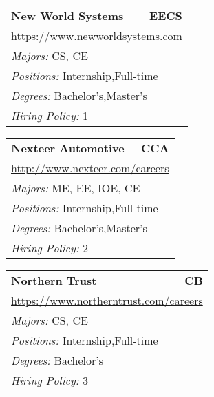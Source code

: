 \documentclass[twoside]{article}
\begin{document}
\begin{center}
\begin{multicols}{3}
\begin{FlushLeft}
\begin{minipage}{\columnwidth}
\end{minipage}
 
\begin{minipage}{\columnwidth}\begin{tabularx}{.95\columnwidth}{Xr}
                 {\Large\bf New World Systems} & {\Large\bf EECS}\\
    \multicolumn{2}{p{.95\columnwidth}}{\url{https://www.newworldsystems.com}}\\
    \multicolumn{2}{p{.95\columnwidth}}{\emph{Majors:} CS, CE}\\
    \multicolumn{2}{p{.95\columnwidth}}{\emph{Positions:} Internship,Full-time}\\
    \multicolumn{2}{p{.95\columnwidth}}{\emph{Degrees:} Bachelor's,Master's}\\
    \multicolumn{2}{p{.95\columnwidth}}{\emph{Hiring Policy:} 1}\\
    \end{tabularx}
    
\end{minipage}
 
\begin{minipage}{\columnwidth}\begin{tabularx}{.95\columnwidth}{Xr}
                 {\Large\bf Nexteer Automotive} & {\Large\bf CCA}\\
    \multicolumn{2}{p{.95\columnwidth}}{\url{http://www.nexteer.com/careers}}\\
    \multicolumn{2}{p{.95\columnwidth}}{\emph{Majors:} ME, EE, IOE, CE}\\
    \multicolumn{2}{p{.95\columnwidth}}{\emph{Positions:} Internship,Full-time}\\
    \multicolumn{2}{p{.95\columnwidth}}{\emph{Degrees:} Bachelor's,Master's}\\
    \multicolumn{2}{p{.95\columnwidth}}{\emph{Hiring Policy:} 2}\\
    \end{tabularx}
    
\end{minipage}
 
\begin{minipage}{\columnwidth}\begin{tabularx}{.95\columnwidth}{Xr}
                 {\Large\bf Northern Trust} & {\Large\bf CB}\\
    \multicolumn{2}{p{.95\columnwidth}}{\url{https://www.northerntrust.com/careers}}\\
    \multicolumn{2}{p{.95\columnwidth}}{\emph{Majors:} CS, CE}\\
    \multicolumn{2}{p{.95\columnwidth}}{\emph{Positions:} Internship,Full-time}\\
    \multicolumn{2}{p{.95\columnwidth}}{\emph{Degrees:} Bachelor's}\\
    \multicolumn{2}{p{.95\columnwidth}}{\emph{Hiring Policy:} 3}\\
    \end{tabularx}
    

\end{minipage}
\end{FlushLeft}
\end{multicols}
\end{center}
\end{document}
